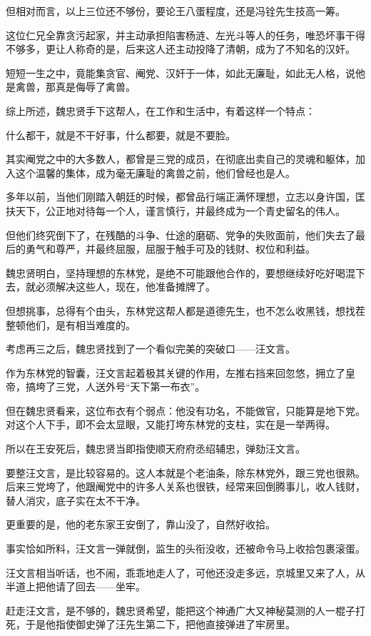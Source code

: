 \begin{multicols}{\theparacolNo}
但相对而言，以上三位还不够份，要论王八蛋程度，还是冯铨先生技高一筹。

这位仁兄全靠贪污起家，并主动承担陷害杨涟、左光斗等人的任务，唯恐坏事干得不够多，更让人称奇的是，后来这人还主动投降了清朝，成为了不知名的汉奸。

短短一生之中，竟能集贪官、阉党、汉奸于一体，如此无廉耻，如此无人格，说他是禽兽，那真是侮辱了禽兽。

综上所述，魏忠贤手下这帮人，在工作和生活中，有着这样一个特点：

什么都干，就是不干好事，什么都要，就是不要脸。

其实阉党之中的大多数人，都曾是三党的成员，在彻底出卖自己的灵魂和躯体，加入这个温馨的集体，成为毫无廉耻的禽兽之前，他们曾经也是人。

多年以前，当他们刚踏入朝廷的时候，都曾品行端正满怀理想，立志以身许国，匡扶天下，公正地对待每一个人，谨言慎行，并最终成为一个青史留名的伟人。

但他们终究倒下了，在残酷的斗争、仕途的磨砺、党争的失败面前，他们失去了最后的勇气和尊严，并最终屈服，屈服于触手可及的钱财、权位和利益。

魏忠贤明白，坚持理想的东林党，是绝不可能跟他合作的，要想继续好吃好喝混下去，就必须解决这些人，现在，他准备摊牌了。

但想挑事，总得有个由头，东林党这帮人都是道德先生，也不怎么收黑钱，想找茬整顿他们，是有相当难度的。

考虑再三之后，魏忠贤找到了一个看似完美的突破口——汪文言。

作为东林党的智囊，汪文言起着极其关键的作用，左推右挡来回忽悠，拥立了皇帝，搞垮了三党，人送外号“天下第一布衣”。

但在魏忠贤看来，这位布衣有个弱点：他没有功名，不能做官，只能算是地下党。对这个人下手，即不会太显眼，又能打垮东林党的支柱，实在是一举两得。

所以在王安死后，魏忠贤当即指使顺天府府丞绍辅忠，弹劾汪文言。

要整汪文言，是比较容易的。这人本就是个老油条，除东林党外，跟三党也很熟。后来三党垮了，他跟阉党中的许多人关系也很铁，经常来回倒腾事儿，收人钱财，替人消灾，底子实在太不干净。

更重要的是，他的老东家王安倒了，靠山没了，自然好收拾。

事实恰如所料，汪文言一弹就倒，监生的头衔没收，还被命令马上收拾包裹滚蛋。

汪文言相当听话，也不闹，乖乖地走人了，可他还没走多远，京城里又来了人，从半道上把他请了回去——坐牢。

赶走汪文言，是不够的，魏忠贤希望，能把这个神通广大又神秘莫测的人一棍子打死，于是他指使御史弹了汪先生第二下，把他直接弹进了牢房里。


\end{multicols}

